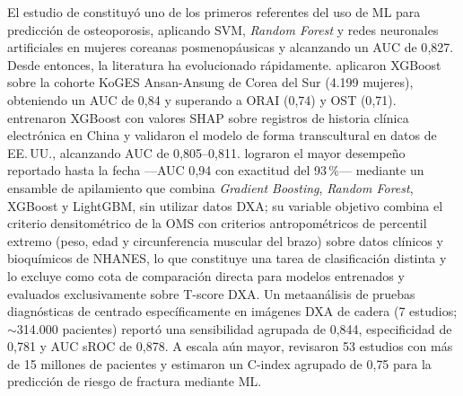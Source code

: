 \documentclass[../tesis.tex]{subfiles}
\begin{document}
El estudio de \textcite{Yoo2013} constituyó uno de los primeros referentes del uso de ML para predicción de osteoporosis, aplicando SVM, \textit{Random Forest} y redes neuronales artificiales en mujeres coreanas posmenopáusicas y alcanzando un AUC de 0{,}827. Desde entonces, la literatura ha evolucionado rápidamente. \textcite{Je2025} aplicaron XGBoost sobre la cohorte KoGES Ansan-Ansung de Corea del Sur (4.199 mujeres), obteniendo un AUC de 0{,}84 y superando a ORAI (0{,}74) y OST (0{,}71). \textcite{Jin2025} entrenaron XGBoost con valores SHAP sobre registros de historia clínica electrónica en China y validaron el modelo de forma transcultural en datos de EE.\,UU., alcanzando AUC de 0{,}805--0{,}811. \textcite{Carvalho2025} lograron el mayor desempeño reportado hasta la fecha ---AUC 0{,}94 con exactitud del 93\,\%--- mediante un ensamble de apilamiento que combina \textit{Gradient Boosting}, \textit{Random Forest}, XGBoost y LightGBM, sin utilizar datos DXA; su variable objetivo combina el criterio densitométrico de la OMS con criterios antropométricos de percentil extremo (peso, edad y circunferencia muscular del brazo) sobre datos clínicos y bioquímicos de NHANES, lo que constituye una tarea de clasificación distinta y lo excluye como cota de comparación directa para modelos entrenados y evaluados exclusivamente sobre T-score DXA\@. Un metaanálisis de pruebas diagnósticas de \textcite{Rahim2023} centrado específicamente en imágenes DXA de cadera (7 estudios; $\sim$314.000 pacientes) reportó una sensibilidad agrupada de 0{,}844, especificidad de 0{,}781 y AUC sROC de 0{,}878. A escala aún mayor, \textcite{Wu2023} revisaron 53 estudios con más de 15 millones de pacientes y estimaron un C-index agrupado de 0{,}75 para la predicción de riesgo de fractura mediante ML.
\end{document}
